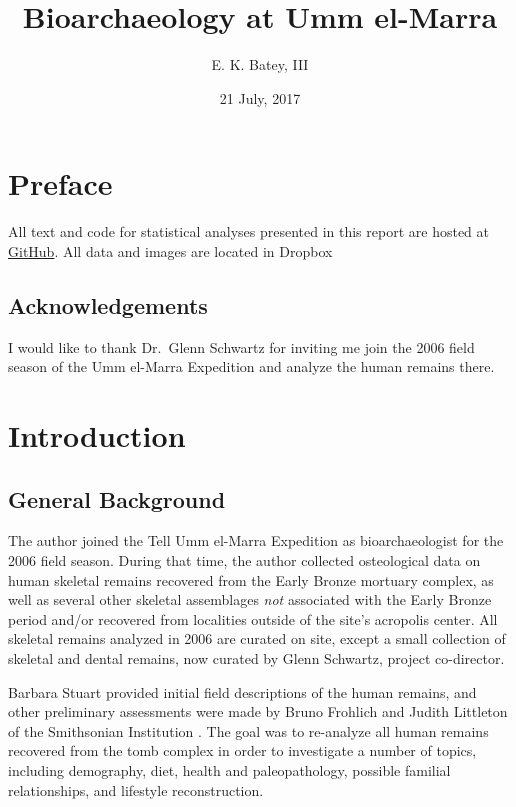 \documentclass[]{book}
\title{Bioarchaeology at Umm el-Marra}
\author{E. K. Batey, III}
\date{21 July, 2017}
\begin{document}
\maketitle

{
\setcounter{tocdepth}{1}
\tableofcontents
}
\chapter*{Preface}\label{preface}

All text and code for statistical analyses presented in this report are
hosted at \href{https://www.github.com/bateyt/elmarra-bioarch}{GitHub}.
All data and images are located in Dropbox

\section*{Acknowledgements}\label{acknowledgements}

I would like to thank Dr.~Glenn Schwartz for inviting me join the 2006
field season of the Umm el-Marra Expedition and analyze the human
remains there.

\chapter{Introduction}\label{intro}

\section{General Background}\label{general-background}

The author joined the Tell Umm el-Marra Expedition as bioarchaeologist
for the 2006 field season. During that time, the author collected
osteological data on human skeletal remains recovered from the Early
Bronze mortuary complex, as well as several other skeletal assemblages
\emph{not} associated with the Early Bronze period and/or recovered from
localities outside of the site's acropolis center. All skeletal remains
analyzed in 2006 are curated on site, except a small collection of
skeletal and dental remains, now curated by Glenn Schwartz, project
co-director.

Barbara Stuart provided initial field descriptions of the human remains,
and other preliminary assessments were made by Bruno Frohlich and Judith
Littleton of the Smithsonian Institution \citep{schwartz2007hidden}. The
goal was to re-analyze all human remains recovered from the tomb complex
in order to investigate a number of topics, including demography, diet,
health and paleopathology, possible familial relationships, and
lifestyle reconstruction.
\end{document}
